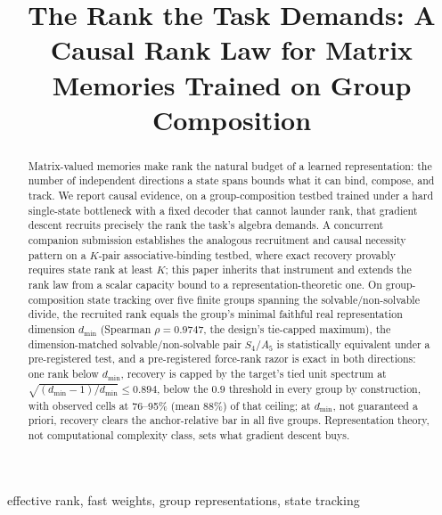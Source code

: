 \documentclass[mlabstract,onecolumn]{jmlr}
\title[A Causal Rank Law for Matrix Memories]{The Rank the Task Demands:
A Causal Rank Law for Matrix Memories Trained on Group Composition}
\newcommand{\dmin}{d_{\min}}
\begin{document}
\maketitle

\begin{abstract}
Matrix-valued memories make rank the natural budget of a learned
representation: the number of independent directions a state spans bounds
what it can bind, compose, and track. We report causal evidence, on a
group-composition testbed trained under a hard single-state bottleneck
with a fixed decoder that cannot launder rank, that gradient descent
recruits precisely the rank the task's algebra demands. A concurrent
companion submission establishes the analogous recruitment and causal
necessity pattern on a $K$-pair associative-binding testbed, where exact
recovery provably requires state rank at least $K$; this paper inherits
that instrument and extends the rank law from a scalar capacity bound to
a representation-theoretic one.
On
group-composition state tracking over five finite groups spanning the
solvable/non-solvable divide, the recruited rank equals the group's minimal
faithful real representation dimension $\dmin$ (Spearman $\rho = 0.9747$,
the design's tie-capped maximum),
the dimension-matched solvable/non-solvable
pair $S_4$/$A_5$ is statistically equivalent under a pre-registered
test,
and a pre-registered force-rank razor is exact in both
directions: one rank below $\dmin$, recovery is capped by the target's
tied unit spectrum at $\sqrt{(\dmin{-}1)/\dmin} \le 0.894$, below the
$0.9$ threshold in every group by construction, with observed cells
at 76--95\% (mean 88\%) of that ceiling;
at $\dmin$, not
guaranteed a priori, recovery clears the
anchor-relative bar in all five groups.
Representation theory, not
computational complexity class, sets what gradient descent buys.
\end{abstract}

\begin{keywords}
effective rank, fast weights, group representations, state tracking
\end{keywords}










\end{document}
